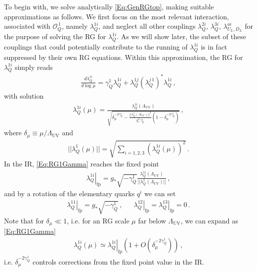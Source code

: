 \documentclass[aps,prl,twocolumn,showpacs,10pt,preprintnumbers,nofootinbib]{revtex4-2}
\newcommand{\gst}{g_*}
\newcommand{\fp}[1]{{\left.#1\right|_{\text{fp}}}}
\newcommand{\op}{\mathcal{O}}
\begin{document}
{%
To begin with, we solve analytically \eqref{Eq:GenRGtop}, making suitable approximations as follows. We first focus on the most relevant interaction, associated with $\op_{Q}^{\,1}$, namely $\lambda_Q^{1i}$, and neglect all other couplings $\lambda_{Q}^{2i},\,\lambda_{Q}^{3i},\,\lambda_{U_L,D_L}^{ai}$ for the purpose of solving the RG for $\lambda_Q^{1i}$. As we will show later, the subset of these couplings that could potentially contribute to the running of $\lambda_Q^{1i}$ is in fact suppressed by their own RG equations. Within this approximation, the RG for $\lambda_Q^{1i}$ simply reads
\begin{align}
    \frac{d \lambda_{Q}^{1i}}{d \log \mu} = \gamma^{1}_Q\lambda_Q^{1i} + \lambda_Q^{1j}(\lambda_Q^{j\,1})^* \lambda_{Q}^{1i}\,,
\end{align}
with solution 
\begin{align}\label{Eq:RG1Gamma}
    \lambda_Q^{1i}(\mu) = \frac{\lambda_Q^{1i}(\Lambda_{\text{UV}})}{ \sqrt{\delta_{\mu}^{-2\gamma_Q^1}-\frac{||\lambda_Q^1(\Lambda_{\text{UV}})||^2}{\gst^2\,\gamma_Q^1}\left(1-\delta_{\mu}^{-2\gamma_Q^1}\right)}}\,,
\end{align}
where $\delta_{\mu} \equiv \mu/\Lambda_{\text{UV}}$ and
\begin{align}
    ||\lambda_Q^{1}(\mu)|| =\sqrt{\sum_{i=1,2,3} \left( \lambda_{Q}^{1i}(\mu)\right)^2}\,.
\end{align}
In the IR, \eqref{Eq:RG1Gamma} reaches the fixed point
\begin{align}
 \fp{\lambda_Q^{1i}} = \gst \sqrt{-\gamma^1_Q} \frac{\lambda_Q^{1i} (\Lambda_{\text{UV}})}{||\lambda_Q^{1}(\Lambda_{\text{UV}})||}\,,
\end{align}
and by a rotation of the elementary quarks $q^i$ we can set 
\begin{align}\label{Eq:FP1}
   \fp{ \lambda_{Q}^{11}}=  \gst \sqrt{-\gamma_Q^1}\,,&& \fp{\lambda_{Q}^{12} }=\fp{\lambda_{Q}^{13}}= 0\,.
\end{align}
Note that for $\delta_{\mu} \ll1$, i.e. for an RG scale $\mu$ far below $\Lambda_{\text{UV}}$, we can expand as \eqref{Eq:RG1Gamma}
\begin{align}\label{Eq:ApproxFixPoint}
    \lambda_Q^{1i}(\mu) \simeq \fp{\lambda_Q^{1i}}\left(1+O\left(\delta_{\mu}^{-2\gamma_Q^1}\right)\right) \,,
\end{align}
i.e. $\delta_{\mu}^{-2 \gamma_Q^1}$ controls corrections from the fixed point value in the IR. 

}
\end{document}
